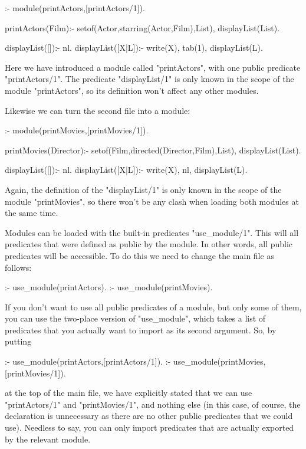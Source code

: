 \begin{LPNcodedisplay}

:- module(printActors,[printActors/1]).

printActors(Film):-
   setof(Actor,starring(Actor,Film),List),
   displayList(List).

displayList([]):- nl.
displayList([X|L]):-
   write(X), tab(1),
   displayList(L).
\end{LPNcodedisplay}
Here we have introduced a module called "printActors",
with one public predicate "printActors/1". The predicate
"displayList/1" is only known in the scope of the module
"printActors", so its definition won't affect any other
modules.

Likewise we can turn the second file into a module:

\begin{LPNcodedisplay}

:- module(printMovies,[printMovies/1]).

printMovies(Director):-
   setof(Film,directed(Director,Film),List),
   displayList(List).

displayList([]):- nl.
displayList([X|L]):-
   write(X), nl,
   displayList(L).
\end{LPNcodedisplay}
Again, the  definition of the
"displayList/1" is only known in the scope of the module
"printMovies", so there won't be any
clash when loading both modules at the same time.

Modules can be loaded with the built-in predicates "use_module/1".
This will  all predicates that were defined as public
by the module. In other words, all public predicates will be
accessible. To do this we need to change the main file as follows:

\begin{LPNcodedisplay}

:- use_module(printActors).
:- use_module(printMovies).
\end{LPNcodedisplay}

If you don't want to use all public predicates of a module, but only
some of them, you can use the two-place version of "use_module", which
takes a list of predicates that you actually want to import as its
 second argument.
So, by putting

\begin{LPNcodedisplay}

:- use_module(printActors,[printActors/1]).
:- use_module(printMovies,[printMovies/1]).
\end{LPNcodedisplay}
at the top of the main file, we have explicitly stated that we
can use "printActors/1" and "printMovies/1", and nothing else (in this
case, of course, the declaration is unnecessary as there are no other
public predicates that we could use).  Needless to say, you can only
import predicates that are actually exported by the relevant module.



